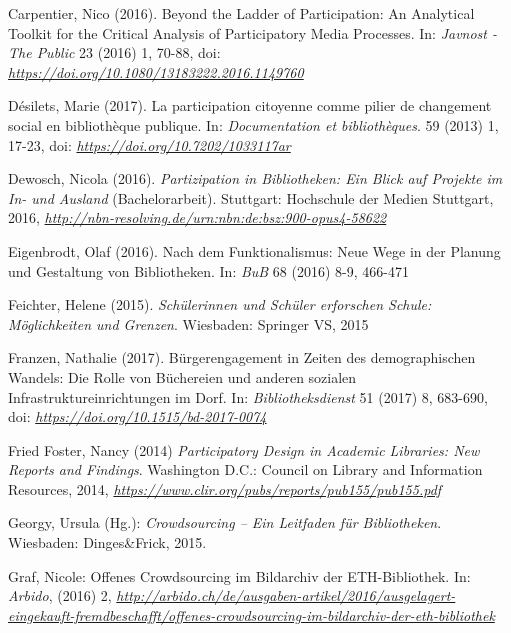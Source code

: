 \documentclass[a4paper,
fontsize=11pt,
oneside,
numbers=noperiodatend,
parskip=half-,
bibliography=totoc,
final
]{scrartcl}
\begin{document}
Carpentier, Nico (2016). Beyond the Ladder of Participation: An
Analytical Toolkit for the Critical Analysis of Participatory Media
Processes. In: \emph{Javnost - The Public} 23 (2016) 1, 70-88, doi:
\href{https://doi.org/10.1080/13183222.2016.1149760}{\emph{https://doi.org/10.1080/13183222.2016.1149760}}

Désilets, Marie (2017). La participation citoyenne comme pilier de
changement social en bibliothèque publique. In: \emph{Documentation et
bibliothèques}. 59 (2013) 1, 17-23, doi:
\href{http://dx.doi.org/10.7202/1033117ar}{\emph{https://doi.org/10.7202/1033117ar}}

Dewosch, Nicola (2016). \emph{Partizipation in Bibliotheken: Ein Blick
auf Projekte im In- und Ausland} (Bachelorarbeit). Stuttgart: Hochschule
der Medien Stuttgart, 2016,
\href{http://nbn-resolving.de/urn:nbn:de:bsz:900-opus4-58622}{\emph{http://nbn-resolving.de/urn:nbn:de:bsz:900-opus4-58622}}

Eigenbrodt, Olaf (2016). Nach dem Funktionalismus: Neue Wege in der
Planung und Gestaltung von Bibliotheken. In: \emph{BuB} 68 (2016) 8-9,
466-471

Feichter, Helene (2015). \emph{Schülerinnen und Schüler erforschen
Schule: Möglichkeiten und Grenzen}. Wiesbaden: Springer VS, 2015

Franzen, Nathalie (2017). Bürgerengagement in Zeiten des demographischen
Wandels: Die Rolle von Büchereien und anderen sozialen
Infrastruktureinrichtungen im Dorf. In: \emph{Bibliotheksdienst} 51
(2017) 8, 683-690, doi:
\href{https://doi.org/10.1515/bd-2017-0074}{\emph{https://doi.org/10.1515/bd-2017-0074}}

Fried Foster, Nancy (2014) \emph{Participatory Design in Academic
Libraries: New Reports and Findings}. Washington D.C.: Council on
Library and Information Resources, 2014,
\href{https://www.clir.org/pubs/reports/pub155/pub155.pdf}{\emph{https://www.clir.org/pubs/reports/pub155/pub155.pdf}}

Georgy, Ursula (Hg.): \emph{Crowdsourcing -- Ein Leitfaden für
Bibliotheken}. Wiesbaden: Dinges\&Frick, 2015.

Graf, Nicole: Offenes Crowdsourcing im Bildarchiv der ETH-Bibliothek.
In: \emph{Arbido}, (2016) 2,
\href{http://arbido.ch/de/ausgaben-artikel/2016/ausgelagert-eingekauft-fremdbeschafft/offenes-crowdsourcing-im-bildarchiv-der-eth-bibliothek}{\emph{http://arbido.ch/de/ausgaben-artikel/2016/ausgelagert-eingekauft-fremdbeschafft/offenes-crowdsourcing-im-bildarchiv-der-eth-bibliothek}}
\end{document}
